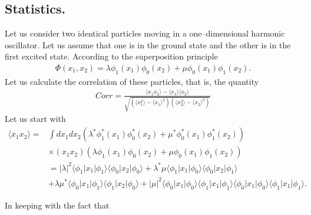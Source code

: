 \begin{subappendices}
   

\section{Statistics.}\label{App6D}
Let us consider two identical particles moving in a one--dimensional harmonic oscillator. Let us assume  that one is in the ground state and the other  is in the first excited state. According to the superposition principle 
\begin{align}\label{eqApp6G1}
\Phi(x_1,x_2)=\lambda\phi_1(x_1)\phi_0(x_2)+\mu\phi_0(x_1)\phi_1(x_2).
\end{align} 
Let us calculate the correlation of these particles, that is, the quantity
\begin{align}\label{eqApp6G2}
Corr=\frac{\langle x_1x_2\rangle-\langle x_1\rangle\langle x_2\rangle}{\sqrt{\left(\langle x_1^2\rangle-\langle x_1\rangle^2\right)\left(\langle x_2^2\rangle-\langle x_2\rangle^2\right)}}
\end{align} 
Let us start with
\begin{align}\label{eqApp63}
\nonumber\langle x_1x_2\rangle=&\int dx_1 dx_2 \left(\lambda^*\phi_1^*(x_1)\phi_0^*(x_2)+\mu^*\phi_0^*(x_1)\phi_1^*(x_2)\right)\\
\nonumber&\times(x_1 x_2)\left(\lambda\phi_1(x_1)\phi_0(x_2)+\mu\phi_0(x_1)\phi_1(x_2)\right)\\
\nonumber &=|\lambda|^2\langle\phi_1|x_1|\phi_1\rangle\langle\phi_0|x_2|\phi_0\rangle+\lambda^*\mu\langle\phi_1|x_1|\phi_0\rangle\langle\phi_0|x_2|\phi_1\rangle\\
&+\lambda\mu^*\langle\phi_0|x_1|\phi_1\rangle\langle\phi_1|x_2|\phi_0\rangle+|\mu|^2\langle\phi_0|x_1|\phi_0\rangle\langle\phi_1|x_1|\phi_1\rangle\langle\phi_0|x_1|\phi_0\rangle\langle\phi_1|x_1|\phi_1\rangle.
\end{align} 

In keeping with the fact that


\end{subappendices}
